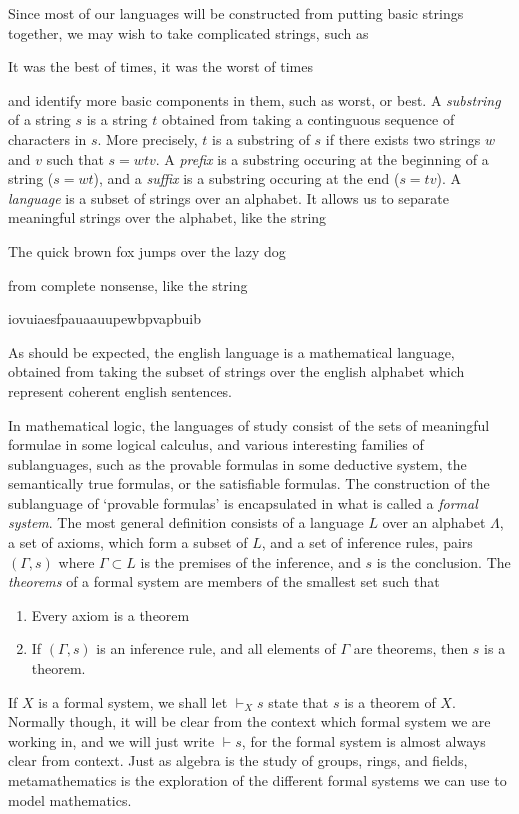 Since most of our languages will be constructed from putting basic strings together, we may wish to take complicated strings, such as
%
\begin{center}
    \textsf{It was the best of times, it was the worst of times}
\end{center}
%
and identify more basic components in them, such as \textsf{worst}, or \textsf{best}. A \emph{substring} of a string $s$ is a string $t$ obtained from taking a continguous sequence of characters in $s$. More precisely, $t$ is a substring of $s$ if there exists two strings $w$ and $v$ such that $s = wtv$. A \emph{prefix} is a substring occuring at the beginning of a string ($s = wt$), and a \emph{suffix} is a substring occuring at the end ($s = tv$). A \emph{language} is a subset of strings over an alphabet. It allows us to separate meaningful strings over the alphabet, like the string
%
\begin{center}
    \textsf{The quick brown fox jumps over the lazy dog}
\end{center}
%
from complete nonsense, like the string
%
\begin{center}
    \textsf{iovuiaesfpauaauupewbpvapbuib}
\end{center}
%
As should be expected, the english language is a mathematical language, obtained from taking the subset of strings over the english alphabet which represent coherent english sentences.

In mathematical logic, the languages of study consist of the sets of meaningful formulae in some logical calculus, and various interesting families of sublanguages, such as the provable formulas in some deductive system, the semantically true formulas, or the satisfiable formulas. The construction of the sublanguage of `provable formulas' is encapsulated in what is called a \emph{formal system}. The most general definition consists of a language $L$ over an alphabet $\Lambda$, a set of axioms, which form a subset of $L$, and a set of inference rules, pairs $(\Gamma, s)$ where $\Gamma \subset L$ is the premises of the inference, and $s$ is the conclusion. The \emph{theorems} of a formal system are members of the smallest set such that
%
\begin{enumerate}
    \item Every axiom is a theorem
    \item If $(\Gamma, s)$ is an inference rule, and all elements of $\Gamma$ are theorems, then $s$ is a theorem.
\end{enumerate}
%
If $X$ is a formal system, we shall let $\vdash_X s$ state that $s$ is a theorem of $X$. Normally though, it will be clear from the context which formal system we are working in, and we will just write $\vdash s$, for the formal system is almost always clear from context. Just as algebra is the study of groups, rings, and fields, metamathematics is the exploration of the different formal systems we can use to model mathematics.

